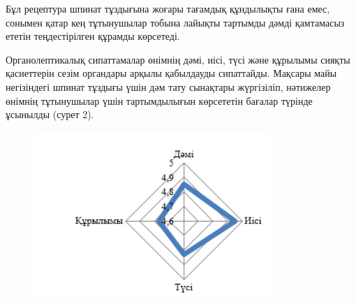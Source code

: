 {%

Бұл рецептура шпинат тұздығына жоғары тағамдық құндылықты ғана емес,
сонымен қатар кең тұтынушылар тобына лайықты тартымды дәмді қамтамасыз
ететін теңдестірілген құрамды көрсетеді.

Органолептикалық сипаттамалар өнімнің дәмі, иісі, түсі және құрылымы
сияқты қасиеттерін сезім органдары арқылы қабылдауды сипаттайды. Мақсары
майы негізіндегі шпинат тұздығы үшін дәм тату сынақтары жүргізіліп,
нәтижелер өнімнің тұтынушылар үшін тартымдылығын көрсететін бағалар
түрінде ұсынылды (сурет 2).

\begin{figure}[H]
	\centering
	\includegraphics[width=0.8\textwidth]{media/pish3/image2}
	\caption*{}
\end{figure}


}

